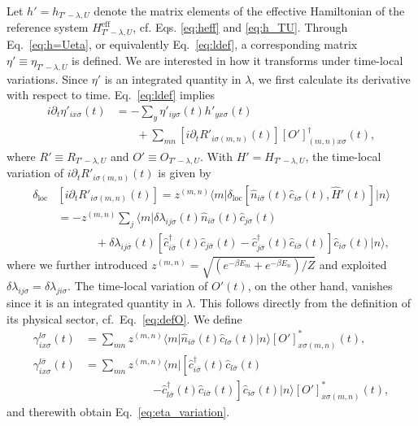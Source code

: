 \documentclass[twocolumn,prb,showpacs,aps,superscriptaddress]{revtex4}
\newcommand{\cd}[1]{\ensuremath{\hat{c}^\dagger_{#1}}}
\newcommand{\cc}[1]{\ensuremath{\hat{c}_{#1}}}
\newcommand{\lwf}[1]{\ensuremath{\langle #1 \vert}}
\newcommand{\rwf}[1]{\ensuremath{\vert #1 \rangle}}
\newcommand{\deltaloc}[0]{\ensuremath{\delta_\mathrm{loc}}}
\begin{document}
Let $h' = h_{T' - \lambda, U}$ denote the matrix elements of the effective
Hamiltonian of the reference system $H^\mathrm{eff}_{T' - \lambda, U}$, cf.
Eqs.  \eqref{eq:heff} and \eqref{eq:h_TU}. Through Eq.\ \eqref{eq:h=Ueta}, or
equivalently Eq.\  \eqref{eq:ldef}, a corresponding matrix $\eta' \equiv
\eta_{T' - \lambda, U}$ is defined. 
We are interested in how it transforms
under time-local variations.  Since $\eta'$ is an integrated quantity in
$\lambda$, we first calculate its derivative with respect to time.  
Eq.\ \eqref{eq:ldef} implies
\begin{align}
  i\partial_t 
  \eta'_{ix\sigma}(t)
  &=
  -\sum_{y}\eta'_{iy\sigma}(t)h'_{yx\sigma}(t)\\
  &\phantom{=}\,\,\,
  +
  \sum_{mn}
  \left[
    i\partial_t R'_{i\sigma(m,n)}(t)
  \right]
  [O']^\dagger_{(m,n)x\sigma}(t),\nonumber
\end{align}
where $R' \equiv R_{T' - \lambda, U}$ and $O' \equiv O_{T' - \lambda, U}$.
With $H' = H_{T' - \lambda, U}$, the time-local variation of $i\partial_t
R'_{i\sigma (m,n)}(t)$ is given by
\begin{align}
  \deltaloc
  &\left[
    i\partial_t R'_{i\sigma(m,n)}(t)
  \right]
  =
  z^{(m,n)}\lwf{m}\deltaloc
  \left[
    \hat{n}_{i\bar{\sigma}}(t)
    \cc{i\sigma}(t),\hat{H}'(t)
  \right]\rwf{n}\nonumber\\
  &=
  -z^{(m,n)}
  \sum_{j}
  \lwf{m}
  \delta\lambda_{ij\sigma}(t)
  \hat{n}_{i\bar{\sigma}}(t)\cc{j\sigma}(t)\nonumber\\
  &\phantom{=}\quad\quad
  +
  \delta\lambda_{ij\bar\sigma}(t)
  \left[
    \cd{i\bar\sigma}(t)\cc{j\bar\sigma}(t)
    -
    \cd{j\bar\sigma}(t)\cc{i\bar\sigma}(t)
  \right]\cc{i\sigma}(t)
  \rwf{n},
\end{align}
where we further introduced $z^{(m,n)} = \sqrt{(e^{-\beta E_m} + e^{-\beta
E_n})/Z}$ and exploited $\delta \lambda_{ij\sigma} = \delta\lambda_{ji\sigma}$.
The time-local variation of $O'(t)$, on the other hand, vanishes since it is an
integrated quantity in $\lambda$. This follows directly from the definition of
its physical sector, cf.\ Eq.\ \eqref{eq:defO}. We define
\begin{align}
  \gamma_{ix\sigma}^{l\sigma}(t)
  &=
  \sum_{mn}
  z^{(m,n)}
  \lwf{m}
    \hat{n}_{i\bar\sigma}(t)
    \cc{l\sigma}(t)
  \rwf{n}
  [O']^*_{x\sigma (m,n)}(t),\\
  \gamma_{ix\sigma}^{l\bar\sigma}(t)
  &=
  \sum_{mn}
  z^{(m,n)}
  \lwf{m}
    \left[
      \cd{i\bar\sigma}(t)\cc{l\bar\sigma}(t)
    \right.\\
    &\qquad\qquad\qquad
    \left.
    -
      \cd{l\bar\sigma}(t)\cc{i\bar\sigma}(t)
  \right]
  \cc{i\sigma}(t)
  \rwf{n}
  [O']^*_{x\sigma (m,n)}(t),\nonumber
\end{align}
and therewith obtain Eq.\ \eqref{eq:eta_variation}.
\end{document}
